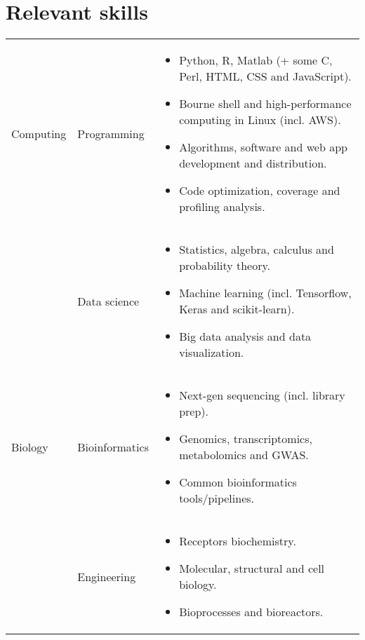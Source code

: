 \documentclass{CV}
\begin{document}
\section*{Relevant skills}
\begin{tabular}{p{} p{} p{}}
Computing & 
	Programming &
		\begin{itemize}\setlength\itemsep{-0.5em}
		\vspace{-1.8em}
		\item Python, R, Matlab (+ some C, Perl, HTML, CSS and JavaScript).
		\item Bourne shell and high-performance computing in Linux (incl. AWS).
		\item Algorithms, software and web app development and distribution.
		\item Code optimization, coverage and profiling analysis.
		\end{itemize}\\
& 
	Data science &
		\begin{itemize}\setlength\itemsep{-0.5em}
		\vspace{-1.8em}
		\item Statistics, algebra, calculus and probability theory.
		\item Machine learning (incl. Tensorflow, Keras and scikit-learn).
		\item Big data analysis and data visualization.
		\end{itemize}\\
		
Biology & 
	Bioinformatics &
		\begin{itemize}\setlength\itemsep{-0.5em}
		\vspace{-1.8em}
		\item Next-gen sequencing (incl. library prep).
		\item Genomics, transcriptomics, metabolomics and GWAS.
		\item Common bioinformatics tools/pipelines.
		\end{itemize}\\
& 
	Engineering &
		\begin{itemize}\setlength\itemsep{-0.5em}
		\vspace{-1.8em}
		\item Receptors biochemistry.
		\item Molecular, structural and cell biology.
		\item Bioprocesses and bioreactors.
		\end{itemize}\\
		

\end{tabular}
\end{document}
